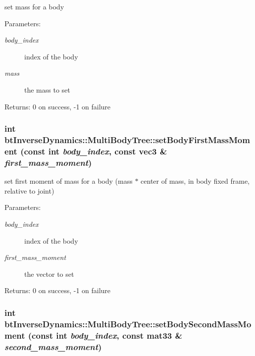 set mass for a body \begin{Desc}
\item[Parameters:]
\begin{description}
\item[{\em body\_\-index}]index of the body \item[{\em mass}]the mass to set \end{description}
\end{Desc}
\begin{Desc}
\item[Returns:]0 on success, -1 on failure \end{Desc}
\hypertarget{classbt_inverse_dynamics_1_1_multi_body_tree_5d8c853cf45160f049977e16175fa288}{
\subsubsection[setBodyFirstMassMoment]{\setlength{\rightskip}{0pt plus 5cm}int btInverseDynamics::MultiBodyTree::setBodyFirstMassMoment (const int {\em body\_\-index}, \/  const {\bf vec3} \& {\em first\_\-mass\_\-moment})}}
\label{classbt_inverse_dynamics_1_1_multi_body_tree_5d8c853cf45160f049977e16175fa288}


set first moment of mass for a body (mass $\ast$ center of mass, in body fixed frame, relative to joint) \begin{Desc}
\item[Parameters:]
\begin{description}
\item[{\em body\_\-index}]index of the body \item[{\em first\_\-mass\_\-moment}]the vector to set \end{description}
\end{Desc}
\begin{Desc}
\item[Returns:]0 on success, -1 on failure \end{Desc}
\hypertarget{classbt_inverse_dynamics_1_1_multi_body_tree_f3c9c78481d8ee170e00946c8499c433}{
\subsubsection[setBodySecondMassMoment]{\setlength{\rightskip}{0pt plus 5cm}int btInverseDynamics::MultiBodyTree::setBodySecondMassMoment (const int {\em body\_\-index}, \/  const mat33 \& {\em second\_\-mass\_\-moment})}}
\label{classbt_inverse_dynamics_1_1_multi_body_tree_f3c9c78481d8ee170e00946c8499c433}


